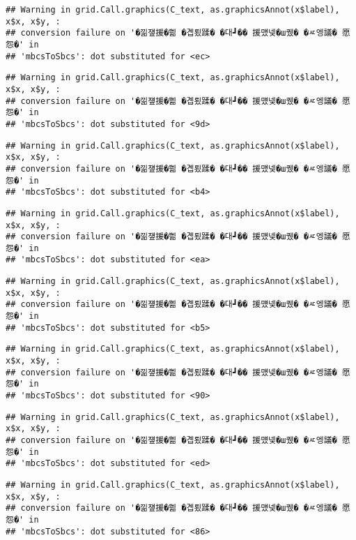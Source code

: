 \documentclass[
]{article}
\begin{document}
\begin{verbatim}
## Warning in grid.Call.graphics(C_text, as.graphicsAnnot(x$label), x$x, x$y, :
## conversion failure on '�낆쟾援�쁾 �곕룄蹂� �대┛�� 援먰넻�ш퀬� �ㅼ엥議� 愿怨�' in
## 'mbcsToSbcs': dot substituted for <ec>
\end{verbatim}

\begin{verbatim}
## Warning in grid.Call.graphics(C_text, as.graphicsAnnot(x$label), x$x, x$y, :
## conversion failure on '�낆쟾援�쁾 �곕룄蹂� �대┛�� 援먰넻�ш퀬� �ㅼ엥議� 愿怨�' in
## 'mbcsToSbcs': dot substituted for <9d>
\end{verbatim}

\begin{verbatim}
## Warning in grid.Call.graphics(C_text, as.graphicsAnnot(x$label), x$x, x$y, :
## conversion failure on '�낆쟾援�쁾 �곕룄蹂� �대┛�� 援먰넻�ш퀬� �ㅼ엥議� 愿怨�' in
## 'mbcsToSbcs': dot substituted for <b4>
\end{verbatim}

\begin{verbatim}
## Warning in grid.Call.graphics(C_text, as.graphicsAnnot(x$label), x$x, x$y, :
## conversion failure on '�낆쟾援�쁾 �곕룄蹂� �대┛�� 援먰넻�ш퀬� �ㅼ엥議� 愿怨�' in
## 'mbcsToSbcs': dot substituted for <ea>
\end{verbatim}

\begin{verbatim}
## Warning in grid.Call.graphics(C_text, as.graphicsAnnot(x$label), x$x, x$y, :
## conversion failure on '�낆쟾援�쁾 �곕룄蹂� �대┛�� 援먰넻�ш퀬� �ㅼ엥議� 愿怨�' in
## 'mbcsToSbcs': dot substituted for <b5>
\end{verbatim}

\begin{verbatim}
## Warning in grid.Call.graphics(C_text, as.graphicsAnnot(x$label), x$x, x$y, :
## conversion failure on '�낆쟾援�쁾 �곕룄蹂� �대┛�� 援먰넻�ш퀬� �ㅼ엥議� 愿怨�' in
## 'mbcsToSbcs': dot substituted for <90>
\end{verbatim}

\begin{verbatim}
## Warning in grid.Call.graphics(C_text, as.graphicsAnnot(x$label), x$x, x$y, :
## conversion failure on '�낆쟾援�쁾 �곕룄蹂� �대┛�� 援먰넻�ш퀬� �ㅼ엥議� 愿怨�' in
## 'mbcsToSbcs': dot substituted for <ed>
\end{verbatim}

\begin{verbatim}
## Warning in grid.Call.graphics(C_text, as.graphicsAnnot(x$label), x$x, x$y, :
## conversion failure on '�낆쟾援�쁾 �곕룄蹂� �대┛�� 援먰넻�ш퀬� �ㅼ엥議� 愿怨�' in
## 'mbcsToSbcs': dot substituted for <86>
\end{verbatim}
\end{document}
